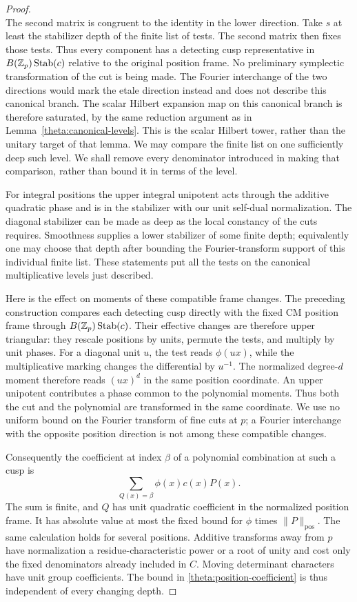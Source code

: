 \begin{proof}
\[\]
The second matrix is congruent to the identity in the lower
direction.  Take $s$ at least the stabilizer depth of the finite
list of tests.  The second matrix then fixes those tests.
Thus every component has a detecting cusp representative in
$B(\mathbb Z_p)\operatorname{Stab}(c)$ relative to the original position
frame.  No preliminary symplectic transformation of the cut is
being made.  The Fourier interchange of the two
directions would mark the etale direction instead and does not
describe this canonical branch.  The scalar Hilbert
expansion map on this canonical branch is therefore saturated,
by the same reduction argument as in
Lemma~\ref{theta:canonical-levels}.  This is the scalar Hilbert
tower, rather than the unitary target of that lemma.
We may compare the finite list on one sufficiently deep such
level.  We shall remove every denominator introduced in making
that comparison, rather than bound it in terms of the level.

For integral positions the upper integral unipotent acts through
the additive quadratic phase and is in the stabilizer with our
unit self-dual normalization.  The diagonal stabilizer can be made
as deep as the local constancy of the cuts requires.  Smoothness
supplies a lower stabilizer of some finite depth; equivalently one
may choose that depth after bounding the Fourier-transform support
of this individual finite list.  These statements put all the tests
on the canonical multiplicative levels just described.

Here is the effect on moments of these compatible frame changes.
The preceding construction compares each detecting cusp directly
with the fixed CM position frame through
$B(\mathbb Z_p)\operatorname{Stab}(c)$.  Their effective changes are
therefore upper triangular: they
rescale positions by units, permute the tests, and multiply by unit
phases.  For a diagonal unit $u$, the test reads $\phi(ux)$, while
the multiplicative marking changes the differential by $u^{-1}$.
The normalized degree-$d$ moment therefore reads $(ux)^d$ in the
same position coordinate.  An upper unipotent contributes a phase
common to the polynomial moments.  Thus both the cut and the
polynomial are transformed in the same coordinate.  We use no
uniform bound on the Fourier transform of fine cuts at $p$; a
Fourier interchange with the opposite position direction is not
among these compatible changes.

Consequently the coefficient at index $\beta$ of a polynomial
combination at such a cusp is
\begin{equation}\label{theta:position-coefficient}
       \sum_{Q(x)=\beta}\phi(x)c(x)P(x).
\end{equation}
The sum is finite, and $Q$ has unit quadratic coefficient in the
normalized position frame.  It has absolute value at most the
fixed bound for $\phi$ times $\|P\|_{\mathrm{pos}}$.  The same
calculation holds for several positions.  Additive transforms away
from $p$ have normalization a residue-characteristic power or a root
of unity and cost only the fixed denominators already included in
$C$.  Moving determinant characters have unit group coefficients.
The bound in \eqref{theta:position-coefficient} is thus independent
of every changing depth.


\end{proof}
